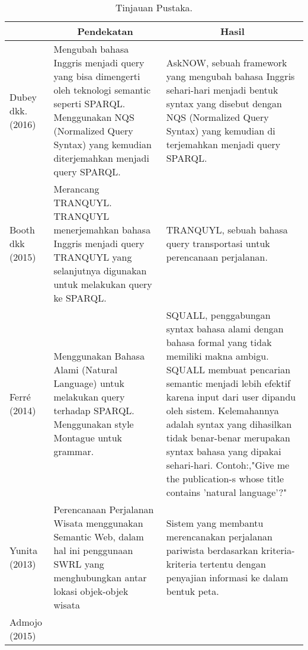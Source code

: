 \begin{table}[]
\centering
\caption{Tinjauan Pustaka.}
\label{tab:perbandingan}
\begin{tabular}{| p{1cm} | p{5.5cm} | p{6cm} |}
\hline
\rowcolor[HTML]{C0C0C0} 
\multicolumn{1}{|c}{\cellcolor[HTML]{C0C0C0}\textbf{Author}} & \multicolumn{1}{|c}{\cellcolor[HTML]{C0C0C0}\textbf{Pendekatan}} & \multicolumn{1}{|c}{\cellcolor[HTML]{C0C0C0}\textbf{Hasil}} \\ \hline
\multicolumn{1}{|p{2cm}|}{Dubey dkk. (2016)} & 
\multicolumn{1}{p{6cm}|}{Mengubah bahasa Inggris menjadi query yang bisa dimengerti oleh teknologi semantic seperti SPARQL. Menggunakan NQS (Normalized Query Syntax) yang kemudian diterjemahkan menjadi query SPARQL.} & 
\multicolumn{1}{p{6cm}|}{AskNOW, sebuah framework yang mengubah bahasa Inggris sehari-hari menjadi bentuk syntax yang disebut dengan NQS (Normalized Query Syntax) yang kemudian di terjemahkan menjadi query SPARQL.} \\ 
\hline
\multicolumn{1}{|p{2cm}|}{Booth dkk (2015)}                      & \multicolumn{1}{p{6cm}|}{Merancang TRANQUYL. TRANQUYL menerjemahkan bahasa Inggris menjadi query TRANQUYL yang selanjutnya digunakan untuk melakukan query ke SPARQL.} & 
\multicolumn{1}{p{6cm}|}{TRANQUYL, sebuah bahasa query transportasi untuk perencanaan perjalanan.} \\ 
\hline
\multicolumn{1}{|p{2cm}|}{Ferr\'{e} (2014)} & 
\multicolumn{1}{p{6cm}|}{Menggunakan Bahasa Alami (Natural Language) untuk melakukan query terhadap SPARQL. Menggunakan style Montague untuk grammar.} & 
\multicolumn{1}{p{6cm}|}{SQUALL, penggabungan syntax bahasa alami dengan bahasa formal yang tidak memiliki makna ambigu. SQUALL membuat pencarian semantic menjadi lebih efektif karena input dari user dipandu oleh sistem. Kelemahannya adalah syntax yang dihasilkan tidak benar-benar merupakan syntax bahasa yang dipakai sehari-hari. Contoh:,"Give me the publication-s whose title contains 'natural language'?"} \\ \hline
\multicolumn{1}{|p{2cm}|}{Yunita (2013)} & 
\multicolumn{1}{p{6cm}|}{Perencanaan Perjalanan Wisata menggunakan Semantic Web, dalam hal ini penggunaan SWRL yang menghubungkan antar lokasi objek-objek wisata} & 
\multicolumn{1}{p{6cm}|}{Sistem yang membantu merencanakan perjalanan pariwista berdasarkan kriteria-kriteria tertentu dengan penyajian informasi ke dalam bentuk peta.} \\ \hline
\multicolumn{1}{|p{2cm}|}{Admojo (2015)} & 

\end{tabular}
\end{table}

